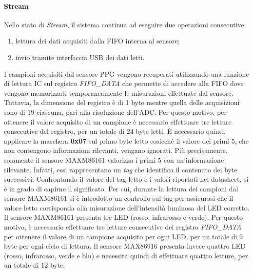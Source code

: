 \paragraph{Stream}
Nello stato di \textit{Stream}, il sistema continua ad eseguire due operazioni consecutive:
\begin{enumerate}
	\item lettura dei dati acquisiti dalla FIFO interna al sensore;
	\item invio tramite interfaccia USB dei dati letti.
\end{enumerate}
I campioni acquisiti dal sensore PPG vengono recuperati utilizzando una funzione di lettura IC  sul registro \textit{FIFO\_DATA} che permette di accedere alla FIFO dove vengono memorizzati temporaneamente le misurazioni effettuate dal sensore. Tuttavia, la dimensione del registro è di 1 byte mentre quella delle acquisizioni sono di \SI{19}{\bit} ciascuna, pari alla risoluzione dell'ADC. Per questo motivo, per ottenere il valore acquisito di un campione è necessario effettuare tre letture consecutive del registro, per un totale di 24 byte letti. \`E necessario quindi applicare la maschera \textbf{0x07} sul primo byte letto cosicché il valore dei primi \SI{5}{\bit}, che non contengono informazioni rilevanti, vengano ignorati. Più precisamente, solamente il sensore MAXM86161 valorizza i primi \SI{5}{\bit} con un'informazione rilevante. Infatti, essi rappresentano un \textit{tag} che identifica il contenuto dei byte successivi. Confrontando il valore del tag letto e i valori riportati nel datasheet, si è in grado di capirne il significato. Per cui, durante la lettura dei campioni dal sensore MAXM86161 si è introdotto un controllo sul tag per assicurasi che il valore letto corrisponda alla misurazione dell'intensità luminosa del LED corretto. Il sensore MAXM86161 presenta tre LED (rosso, infrarosso e verde). Per questo motivo, è necessario effettuare tre letture consecutive del registro \textit{FIFO\_DATA} per ottenere il valore di un campione acquisito per ogni LED, per un totale di 9 byte per ogni ciclo di lettura. Il sensore MAX86916 presenta invece quattro LED (rosso, infrarosso, verde e blu) e necessita quindi di effettuare quattro letture, per un totale di 12 byte.

